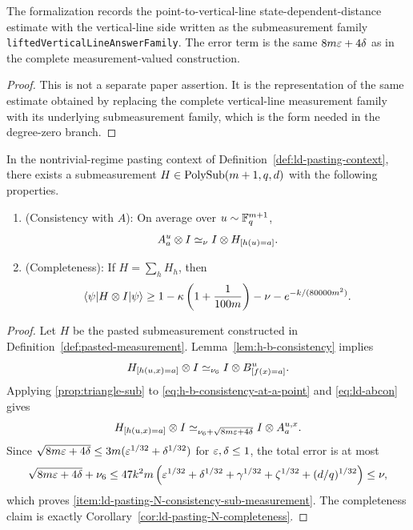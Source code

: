 \begin{lemma}\label{lem:lean-point-vertical-line-sdd-lifted-family}
	\leanok
	The formalization records the point-to-vertical-line state-dependent-distance
	estimate with the vertical-line side written as the submeasurement
	family \texttt{liftedVerticalLineAnswerFamily}. The error term is the same
	\(8m\varepsilon+4\delta\) as in the complete measurement-valued construction.
\end{lemma}
\begin{proof}
	\leanok
	This is not a separate paper assertion. It is the representation of the same
	estimate obtained by replacing the complete vertical-line measurement family
	with its underlying submeasurement family, which is the form needed in
	the degree-zero branch.
\end{proof}

\begin{lemma}\label{lem:ld-pasting-sub-measurement}
	\leanok
	In the nontrivial-regime pasting context of Definition~\ref{def:ld-pasting-context},
	there exists a submeasurement $H \in \mathrm{PolySub}(m+1,q,d)$ with the following
	properties.
	\begin{enumerate}
		\item (Consistency with $A$): \label{item:ld-pasting-N-consistency-sub-measurement}
		      On average over $u \sim \mathbb{F}_q^{m+1}$,
		      \[
			      A_a^u \otimes I \simeq_\nu I \otimes H_{[h(u)=a]}.
		      \]
		\item (Completeness): \label{item:ld-pasting-N-completeness-sub-measurement}
		      If $H = \sum_h H_h$, then
		      \[
			      \langle \psi \rvert H \otimes I \lvert \psi \rangle
			      \ge
			      1 - \kappa\left(1+\frac{1}{100m}\right) - \nu - e^{-k/(80000m^2)}.
		      \]
	\end{enumerate}
\end{lemma}
\begin{proof}
	\leanok
	Let $H$ be the pasted submeasurement constructed in Definition~\ref{def:pasted-measurement}. Lemma~\ref{lem:h-b-consistency} implies
	\begin{equation}\label{eq:h-b-consistency-at-a-point}
		H_{[h(u,x)=a]} \otimes I \simeq_{\nu_6} I \otimes B^u_{[f(x)=a]}.
	\end{equation}
	Applying \ref{prop:triangle-sub} to \ref{eq:h-b-consistency-at-a-point} and \ref{eq:ld-abcon} gives
	\[
		H_{[h(u,x)=a]} \otimes I \simeq_{\nu_6+\sqrt{8m\varepsilon+4\delta}} I \otimes A_a^{u,x}.
	\]
	Since $\sqrt{8m\varepsilon+4\delta}\le 3m(\varepsilon^{1/32}+\delta^{1/32})$ for $\varepsilon,\delta\le 1$, the total error is at most
	\[
		\sqrt{8m\varepsilon+4\delta}+\nu_6 \le 47k^2m\left(\varepsilon^{1/32}+\delta^{1/32}+\gamma^{1/32}+\zeta^{1/32}+(d/q)^{1/32}\right)\le \nu,
	\]
	which proves \ref{item:ld-pasting-N-consistency-sub-measurement}. The completeness claim is exactly Corollary~\ref{cor:ld-pasting-N-completeness}.
\end{proof}

